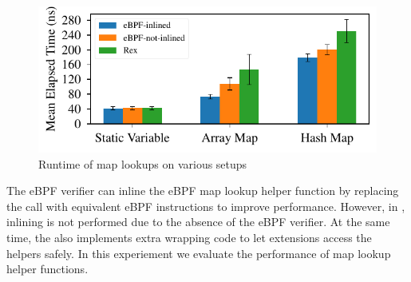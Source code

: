 \begin{figure}[t]
    \includegraphics[width=1.0\linewidth]{figs/inline.pdf}
    \centering
    \vspace{-25pt}
    \caption{Runtime of map lookups on various setups}
    \label{fig:eval-inline}
    \vspace{-12pt}
\end{figure}

The eBPF verifier can inline the eBPF map lookup
    helper function by replacing the call with equivalent eBPF instructions to
    improve performance.
However, in \projname{}, inlining is not performed due to the absence of the
    eBPF verifier. %
At the same time, the \projname{} also implements extra wrapping code to let
    extensions access the helpers safely.
In this experiement we evaluate the performance of map lookup helper functions.

